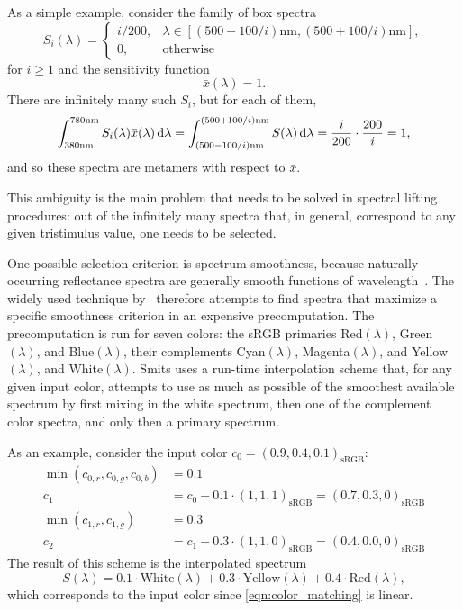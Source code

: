 As a simple example, consider the family of box spectra
\begin{equation*}
    S_i(\lambda) = \begin{cases}
        i / 200, &\lambda \in [ (500-100/i)\unit{\nano\meter}, (500+100/i)\unit{\nano\meter}],\\
        0, &\text{otherwise}
    \end{cases}
\end{equation*}
for $i \geq 1 $ and the sensitivity function
\begin{equation*}
    \bar x(\lambda) = 1.
\end{equation*}
There are infinitely many such $S_i$, but for each of them,
\begin{equation*}
    \int_{380\unit{\nano\meter}}^{780\unit{\nano\meter}} S_i(\lambda) \bar x(\lambda)\d\lambda
    = 
    \int_{(500-100/i)\unit{\nano\meter}}^{(500+100/i)\unit{\nano\meter}} S(\lambda)\d\lambda
    = \frac{i}{200} \cdot \frac{200}{i} = 1,
\end{equation*}
and so these spectra are metamers with respect to $\bar x$.

This ambiguity is the main problem that needs to be solved in spectral
lifting procedures: out of the infinitely many spectra that, in general,
correspond to any given tristimulus value, one needs to be selected.

One possible selection criterion is spectrum smoothness, because naturally occurring
reflectance spectra are generally smooth functions of wavelength~\parencite{maloney86}. 
The widely
used technique by~\textcite{smits99} therefore attempts to find spectra that
maximize a specific smoothness criterion in an expensive precomputation.
The precomputation is run for seven colors: the sRGB primaries 
Red$(\lambda)$, Green$(\lambda)$, and Blue$(\lambda)$, 
their complements
Cyan$(\lambda)$, Magenta$(\lambda)$, and Yellow$(\lambda)$, and White$(\lambda)$. 
Smits uses a run-time interpolation scheme
that, for any given input color, attempts to use as much as possible 
of the smoothest available spectrum by first mixing in the white spectrum, 
then one of the complement color spectra, and only then a primary spectrum.

As an example, consider the input color $c_0=(0.9, 0.4, 0.1)_\text{sRGB}$:
\begin{align*}
    \min(c_{0,r}, c_{0,g}, c_{0,b}) &= 0.1\\
    c_1 &= c_0 - 0.1\cdot(1,1,1)_\text{sRGB} = (0.7, 0.3, 0)_\text{sRGB}\\
    \min(c_{1,r}, c_{1,g}) &= 0.3\\
    c_2 &= c_1 - 0.3\cdot(1,1,0)_\text{sRGB} = (0.4, 0.0, 0)_\text{sRGB}
\end{align*}
The result of this scheme is the interpolated spectrum
\begin{equation}
    S(\lambda) = 0.1\cdot \text{White}(\lambda)
               + 0.3\cdot \text{Yellow}(\lambda)
               + 0.4\cdot \text{Red}(\lambda),
\end{equation}
which corresponds to the input color since \cref{eqn:color_matching} is linear.

